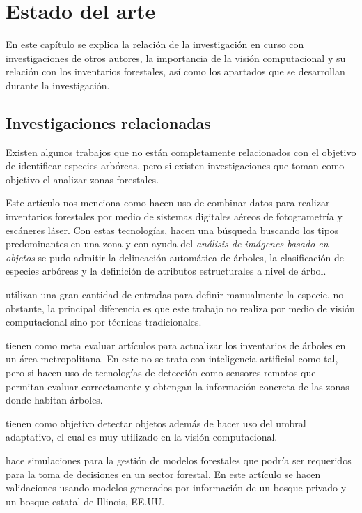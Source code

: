 \chapter{Estado del arte}
En este capítulo se explica la relación de la investigación en curso con investigaciones de otros autores, la importancia de la visión computacional y su relación con los inventarios forestales, así como los apartados que se desarrollan durante la investigación.

\section{Investigaciones relacionadas}
Existen algunos trabajos que no están completamente relacionados con el objetivo de identificar especies arbóreas, pero si existen investigaciones que toman como objetivo el analizar zonas forestales.

Este artículo nos menciona como hacen uso de combinar datos para realizar inventarios forestales por medio de sistemas digitales aéreos de fotogrametría y escáneres láser. Con estas tecnologías, hacen una búsqueda buscando los tipos predominantes en una zona y con ayuda del \emph{análisis de imágenes basado en objetos} se pudo admitir la delineación automática de árboles, la clasificación de especies arbóreas y la definición de atributos estructurales a nivel de árbol. 
\newline
\break


\citet{rf1} utilizan una gran cantidad de entradas para definir manualmente la especie, no obstante, la principal diferencia es que este trabajo no realiza por medio de visión computacional sino por técnicas tradicionales.
 
\citet{rf2} tienen como meta evaluar artículos para actualizar los inventarios de árboles en un área metropolitana. En este no se trata con inteligencia artificial como tal, pero si hacen uso de tecnologías de detección como sensores remotos que permitan evaluar correctamente y obtengan la información concreta de las zonas donde habitan  árboles.

\citet{rf3} tienen como objetivo detectar objetos además de hacer uso del umbral adaptativo, el cual es muy utilizado en la visión computacional. %

\citet{rf9} hace simulaciones para la gestión de modelos forestales que podría ser requeridos para la toma de decisiones en un sector forestal. En este artículo se hacen validaciones usando modelos generados por información de un bosque privado y un bosque estatal de Illinois, EE.UU.

